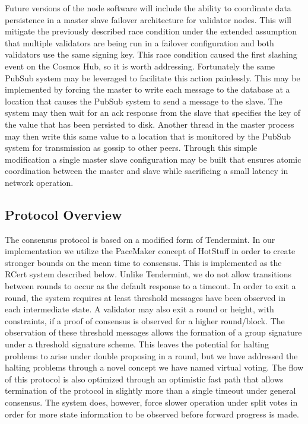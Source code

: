 Future versions of the node software will include the ability to
coordinate data persistence in a master slave failover architecture for
validator nodes.
This will mitigate the previously described race condition under the
extended assumption that multiple validators are being run in a
failover configuration and both validators use the same signing key.
This race condition caused the first slashing event on the Cosmos Hub,
so it is worth addressing.
Fortunately the same PubSub system may be leveraged to facilitate this
action painlessly.
This may be implemented by forcing the master to write each message to
the database at a location that causes the PubSub system to send a
message to the slave.
The system may then wait for an ack response from the slave that
specifies the key of the value that has been persisted to disk.
Another thread in the master process may then write this same value to
a location that is monitored by the PubSub system for transmission as
gossip to other peers.
Through this simple modification a single master slave configuration
may be built that ensures atomic coordination between the master and
slave while sacrificing a small latency in network operation.


\subsection{Protocol Overview}

The \LayerTwo{} consensus protocol is based on a modified form of
Tendermint.
In our implementation we utilize the PaceMaker concept of HotStuff in
order to create stronger bounds on the mean time to consensus.
This is implemented as the RCert system described below.
Unlike Tendermint, we do not allow transitions between rounds to occur
as the default response to a timeout.
In order to exit a round, the system requires at least threshold
messages have been observed in each intermediate state.
A validator may also exit a round or height, with constraints, if a
proof of consensus is observed for a higher round/block.
The observation of these threshold messages allows the formation of a
group signature under a threshold signature scheme.
This leaves the potential for halting problems to arise under double
proposing in a round, but we have addressed the halting problems
through a novel concept we have named virtual voting.
The flow of this protocol is also optimized through an optimistic fast
path that allows termination of the protocol in slightly more than a
single timeout under general consensus.
The system does, however, force slower operation under split votes in
order for more state information to be observed before forward progress
is made.

